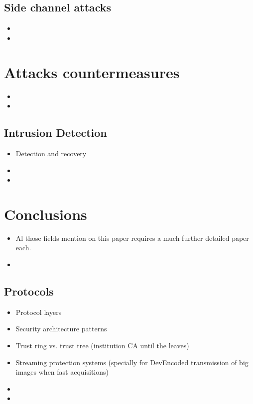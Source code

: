 \documentclass[10pt,a4paper,twoside]{llncs}
\begin{document}
%
\subsection{Side channel attacks \label{sec:sideChannelAttacks}}

\begin{itemize}
 \item
 \item 
\end{itemize}

%
\section{Attacks countermeasures \label{sec:countermeasures}}

\begin{itemize}
 \item
 \item 
\end{itemize}

%
\subsection{Intrusion Detection \label{sec:intrusionDetection}}

\begin{itemize}
 \item Detection and recovery
 \item 
 \item 
\end{itemize}

%
\section{Conclusions \label{sec:conclusions}}

\begin{itemize}
 \item Al those fields mention on this paper requires a much further detailed paper each.
 \item 
\end{itemize}

%
\subsection{Protocols \label{sec:protocols}}

\begin{itemize}
 \item Protocol layers \cite{Schneier:1995:ACP:572932}
 \item Security architecture patterns
 \item Trust ring vs. trust tree (institution CA until the leaves)
 \item Streaming protection systems (specially for DevEncoded transmission of big images when fast acquisitions)
 \item 
 \item 
\end{itemize}
\end{document}

